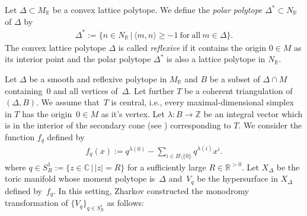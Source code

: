 \documentclass[10pt,a4paper]{amsart}
\numberwithin{equation}{section}
\begin{document}
\begin{Definition}
Let $\Delta \subset M_{\mathbb R}$ be a convex lattice polytope.
We def\/ine the {\it polar polytope} $\Delta^\ast \subset N_{\mathbb R}$ of $\Delta$ by
\begin{gather*}
\Delta^\ast:=\{ n \in N_{\mathbb R} \,|\, \langle m ,n \rangle \geq -1\ \mathrm{for\ all\ } m \in \Delta \}.
\end{gather*}
The convex lattice polytope $\Delta$ is called {\it reflexive} if it contains the origin $0 \in M$ as its interior point and the polar polytope $\Delta^\ast$ is also a lattice polytope in $N_{\mathbb R}$.
\end{Definition}

Let $\Delta$ be a smooth and ref\/lexive polytope in $M_{\mathbb R}$ and $B$ be a subset of $\Delta \cap M$ containing~$0$ and all vertices of~$\Delta$.
Let further $T$ be a coherent triangulation of $(\Delta, B)$. We assume that~$T$ is central, i.e., every maximal-dimensional simplex in $T$ has the origin~$0 \in M$ as it's vertex. Let $\lambda \colon B \to {\mathbb Z}$ be an integral vector which is in the interior of the secondary cone (see \cite[Chap\-ter~7, Def\/inition~1.4]{MR2394437}) corresponding to $T$. We consider the function $f_q$ def\/ined by
\begin{gather*}
f_q(x):=q^{\lambda(0)}-\sum_{i \in B \setminus \{0\}} q^{\lambda(i)}x^{i}.
\end{gather*}
where $q \in S_R^1:=\{ z \in {\mathbb C} \,|\, |z|=R \}$ for a suf\/f\/iciently large $R \in {\mathbb R}^{>0}$. Let $X_\Delta$ be the toric manifold whose moment polytope is~$\Delta$ and~$V_q$ be the hypersurface in $X_\Delta$ def\/ined by~$f_q$. In this setting, Zharkov constructed the monodromy transformation of $\{V_q\}_{q \in S_R^1}$ as follows:
\end{document}
